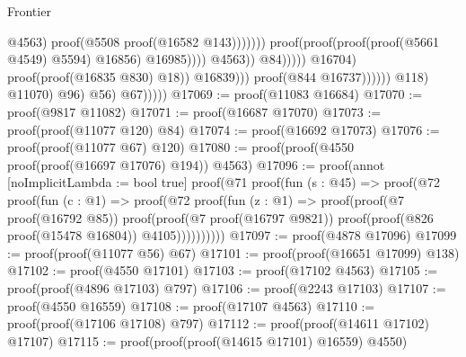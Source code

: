 \begin{lexlean}{Frontier}
\begin{coremodule}
                                                                                                  @4563)
                                                                                                proof(@5508
                                                                                                    proof(@16582
                                                                                                        @143)))))))
                                                                                proof(proof(proof(proof(@5661
                                                                                          @4549)
                                                                                        @5594)
                                                                                      @16856)
                                                                                    @16985))))
                                                                      @4563))
                                                                @84)))))
                                                @16704)
                                              proof(proof(@16835 @830) @18))
                                            @16839)))
                                    proof(@844 @16737))))))
                        @118)
                      @11070)
                    @96)
                  @56)
                @67)))))
@17069 := proof(@11083 @16684)
@17070 := proof(@9817 @11082)
@17071 := proof(@16687 @17070)
@17073 := proof(proof(@11077 @120) @84)
@17074 := proof(@16692 @17073)
@17076 := proof(proof(@11077 @67) @120)
@17080 := proof(proof(@4550 proof(proof(@16697 @17076) @194)) @4563)
@17096 := proof(annot [noImplicitLambda := bool true]
    proof(@71
        proof(fun (s : @45) =>
          proof(@72
              proof(fun (c : @1) =>
                proof(@72
                    proof(fun (z : @1) =>
                      proof(proof(@7 proof(@16792 @85))
                          proof(proof(@7 proof(@16797 @9821))
                              proof(proof(@826 proof(@15478 @16804)) @4105))))))))))
@17097 := proof(@4878 @17096)
@17099 := proof(proof(@11077 @56) @67)
@17101 := proof(proof(@16651 @17099) @138)
@17102 := proof(@4550 @17101)
@17103 := proof(@17102 @4563)
@17105 := proof(proof(@4896 @17103) @797)
@17106 := proof(@2243 @17103)
@17107 := proof(@4550 @16559)
@17108 := proof(@17107 @4563)
@17110 := proof(proof(@17106 @17108) @797)
@17112 := proof(proof(@14611 @17102) @17107)
@17115 := proof(proof(proof(@14615 @17101) @16559) @4550)

\end{coremodule}
\end{lexlean}
